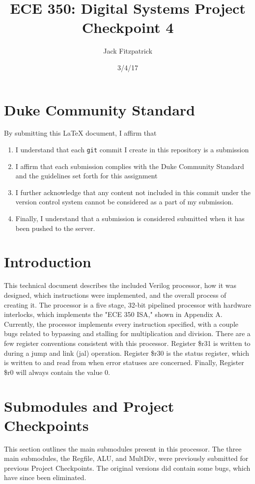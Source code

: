 \documentclass[letterpaper]{article} %
\begin{document}
\title{ECE 350: Digital Systems Project Checkpoint 4}
\author{Jack Fitzpatrick} %
\date{3/4/17} %
\maketitle

\section*{Duke Community Standard}

By submitting this \LaTeX{} document, I affirm that
\begin{enumerate}
    \item I understand that each \texttt{git} commit I create in this repository is a submission
    \item I affirm that each submission complies with the Duke Community Standard and the guidelines set forth for this assignment
    \item I further acknowledge that any content not included in this commit under the version control system cannot be considered as a part of my submission.
    \item Finally, I understand that a submission is considered submitted when it has been pushed to the server.
\end{enumerate}

\section*{Introduction}
This technical document describes the included Verilog processor, how it was designed, which instructions were implemented, and the overall process of creating it. The processor is a five stage, 32-bit pipelined processor with hardware interlocks, which implements the "ECE 350 ISA," shown in Appendix A. Currently, the processor implements every instruction specified, with a couple bugs related to bypassing and stalling for multiplication and division. There are a few register conventions consistent with this processor. Register \$r31 is written to during a jump and link (jal) operation. Register \$r30 is the status register, which is written to and read from when error statuses are concerned. Finally, Register \$r0 will always contain the value 0.
\newpage
\section*{Submodules and Project Checkpoints}
This section outlines the main submodules present in this processor. The three main submodules, the Regfile, ALU, and MultDiv, were previously submitted for previous Project Checkpoints. The original versions did contain some bugs, which have since been eliminated. \\
\end{document}
